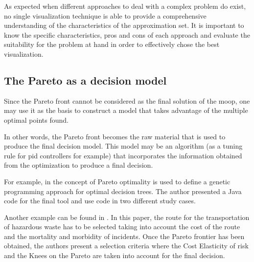 As expected when different approaches to deal with a complex problem do exist, no single visualization technique is able to provide a comprehensive understanding of the characteristics of the approximation set. It is important to know the specific characteristics, pros and cons of each approach and evaluate the suitability for the problem at hand in order to effectively chose the best visualization.
  
\subsection{The Pareto as a decision model}
\label{sec:ParetoData}
%
Since the Pareto front cannot be considered as the final solution of the \gls{moop}, one may use it as the basis to construct a model that takes advantage of the multiple optimal points found.

In other words, the Pareto front becomes the raw material that is used to produce the final decision model. This model may be an algorithm (as a tuning rule for \gls{pid} controllers for example) that incorporates the information obtained from the optimization to produce a final decision.

For example, in \cite{Zhao2007}	the concept of Pareto optimality is used to define a genetic programming approach for optimal decision trees. The author presented a Java code for the final tool and use code in two different study cases.

Another example can be found in \cite{Das2012}. In this paper, the route for the transportation of hazardous waste has to be selected taking into account the cost of the route and the mortality and morbidity of incidents. Once the Pareto frontier has been obtained, the authors present a selection criteria where the Cost Elasticity of risk and the Knees on the Pareto are taken into account for the final decision.
%
%


